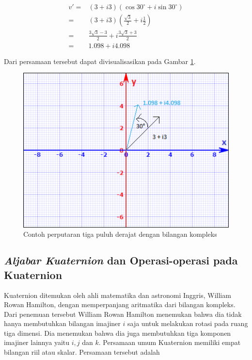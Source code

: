 \begin{equation}
	\begin{split}
		v' = &(3 + i3)(\cos 30^{\circ} + i \sin 30^{\circ})\\
		= & (3 + i3)(\frac{\sqrt{3}}{2} + i \frac{1}{2})\\
		= & \frac{3\sqrt{3}-3}{2} + i\frac{3\sqrt{3}+3}{2}\\
		= & 1.098 + i4.098
	\end{split}
\label{eq:rotasi_kompleks_tiga_puluh_derajat}
\end{equation}

Dari persamaan tersebut dapat divisualisasikan pada Gambar \ref{fig:diagram-rotasi-kompleks1}.

\begin{figure}[htbp]
\centering
\includegraphics[scale=1]{Gambar/diagram-rotasi-kompleks1.png}
\caption{Contoh perputaran tiga puluh derajat dengan bilangan kompleks} 
\label{fig:diagram-rotasi-kompleks1}
\end{figure}
\subsection{\textit{Aljabar Kuaternion} dan Operasi-operasi pada Kuaternion}
\cite{kuipers:1999}
Kuaternion ditemukan oleh ahli matematika dan astronomi Inggris, William Rowan Hamilton, dengan memperpanjang aritmatika dari bilangan kompleks. Dari penemuan tersebut William Rowan Hamilton menemukan bahwa dia tidak hanya membutuhkan bilangan imajiner \(i\) saja untuk melakukan rotasi pada ruang tiga dimensi. Dia menemukan bahwa dia juga membutuhkan tiga komponen imajiner lainnya yaitu \(i,j\) dan \(k\). Persamaan umum Kuaternion memiliki empat bilangan riil atau skalar. Persamaan tersebut adalah 

